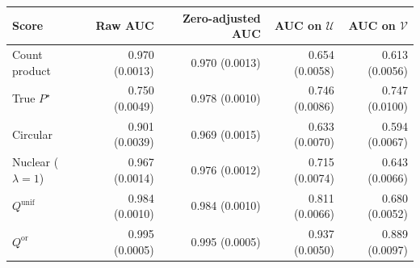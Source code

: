 \begin{tabular}{lrrrr}
\toprule
Score & Raw AUC & Zero-adjusted AUC & AUC on $\mathcal{U}$ & AUC on $\mathcal{V}$ \\
\midrule
Count product & 0.970 (0.0013) & 0.970 (0.0013) & 0.654 (0.0058) & 0.613 (0.0056) \\
True $P^\star$ & 0.750 (0.0049) & 0.978 (0.0010) & 0.746 (0.0086) & 0.747 (0.0100) \\
Circular & 0.901 (0.0039) & 0.969 (0.0015) & 0.633 (0.0070) & 0.594 (0.0067) \\
Nuclear ($\lambda=1$) & 0.967 (0.0014) & 0.976 (0.0012) & 0.715 (0.0074) & 0.643 (0.0066) \\
$Q^{\mathrm{unif}}$ & 0.984 (0.0010) & 0.984 (0.0010) & 0.811 (0.0066) & 0.680 (0.0052) \\
$Q^{\mathrm{or}}$ & 0.995 (0.0005) & 0.995 (0.0005) & 0.937 (0.0050) & 0.889 (0.0097) \\
\bottomrule
\end{tabular}

